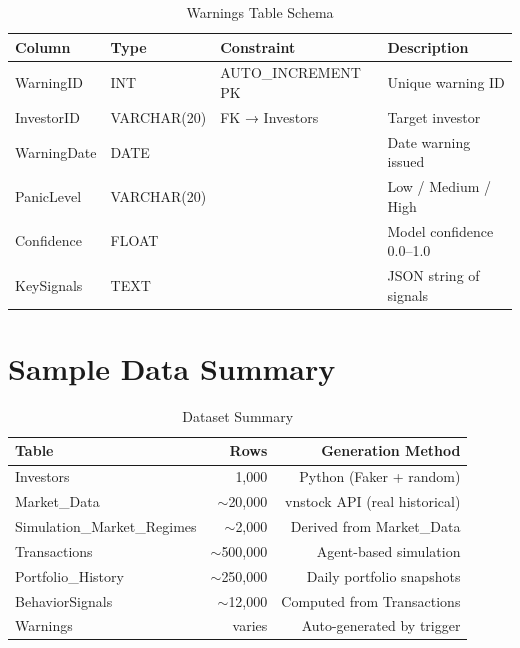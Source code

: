 \begin{table}[H]
    \centering
    \caption{Warnings Table Schema}
    \begin{tabular}{llll}
        \toprule
        \textbf{Column} & \textbf{Type} & \textbf{Constraint} & \textbf{Description} \\
        \midrule
        WarningID & INT & AUTO\_INCREMENT PK & Unique warning ID \\
        InvestorID & VARCHAR(20) & FK → Investors & Target investor \\
        WarningDate & DATE & & Date warning issued \\
        PanicLevel & VARCHAR(20) & & Low / Medium / High \\
        Confidence & FLOAT & & Model confidence 0.0–1.0 \\
        KeySignals & TEXT & & JSON string of signals \\
        \bottomrule
    \end{tabular}
\end{table}

\section{Sample Data Summary}

\begin{table}[H]
    \centering
    \caption{Dataset Summary}
    \begin{tabular}{lrr}
        \toprule
        \textbf{Table} & \textbf{Rows} & \textbf{Generation Method} \\
        \midrule
        Investors & 1,000 & Python (Faker + random) \\
        Market\_Data & $\sim$20,000 & vnstock API (real historical) \\
        Simulation\_Market\_Regimes & $\sim$2,000 & Derived from Market\_Data \\
        Transactions & $\sim$500,000 & Agent-based simulation \\
        Portfolio\_History & $\sim$250,000 & Daily portfolio snapshots \\
        BehaviorSignals & $\sim$12,000 & Computed from Transactions \\
        Warnings & varies & Auto-generated by trigger \\
        \bottomrule
    \end{tabular}
\end{table}
